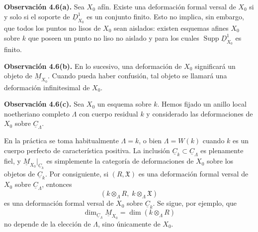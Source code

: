 
\medskip
\noindent\textbf{Observación 4.6(a).}
Sea $X_0$ afín. Existe una deformación formal versal de $X_0$ si y
solo si el soporte de $\underline D^1_{X_0}$ es un conjunto finito.
Esto no implica, sin embargo, que todos los puntos no lisos de $X_0$
sean aislados: existen esquemas afines $X_0$ sobre $k$ que poseen un
punto no liso no aislado y para los cuales
$\operatorname{Supp}\underline D^1_{X_0}$ es finito.

\medskip
\noindent\textbf{Observación 4.6(b).}
En lo sucesivo, una deformación de $X_0$ significará un objeto de
$\underline M_{X_0}$. Cuando pueda haber confusión, tal objeto se
llamará una deformación infinitesimal de $X_0$.

\medskip
\noindent\textbf{Observación 4.6(c).}
Sea $X_0$ un esquema sobre $k$. Hemos fijado un anillo local
noetheriano completo $\Lambda$ con cuerpo residual $k$ y considerado
las deformaciones de $X_0$ sobre $\underline C_\Lambda$.


En la práctica se toma habitualmente $\Lambda=k$, o bien
$\Lambda=W(k)$ cuando $k$ es un cuerpo perfecto de característica
positiva. La inclusión
$\underline C_k\subset\underline C_\Lambda$ es plenamente fiel, y
$\underline M_{X_0}|_{\underline C_k}$ es simplemente la categoría
de deformaciones de $X_0$ sobre los objetos de $\underline C_k$.
Por consiguiente, si $(R,\mathfrak X)$ es una deformación formal
versal de $X_0$ sobre $\underline C_\Lambda$, entonces
\[
 (k\otimes_\Lambda R,\;k\otimes_\Lambda\mathfrak X)
\]
es una deformación formal versal de $X_0$ sobre
$\underline C_k$. Se sigue, por ejemplo, que
\[
 \dim_{\underline C_\Lambda}\underline M_{X_0}
 =\dim(k\otimes_\Lambda R)
\]
no depende de la elección de $\Lambda$, sino únicamente de $X_0$.

